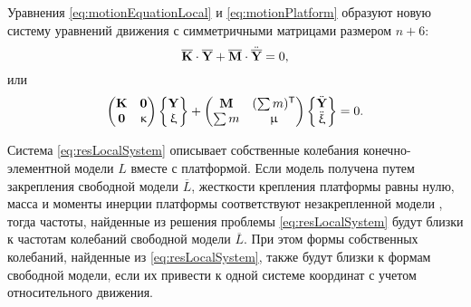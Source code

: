 Уравнения \eqref{eq:motionEquationLocal} и \eqref{eq:motionPlatform} образуют новую систему уравнений движения с симметричными матрицами размером $ n + 6 $:
\begin{equation*}
	\overline{\mathbf{K}} \cdot \overline{\mathbf{Y}} + \overline{\mathbf{M}} \cdot \ddot{\overline{\mathbf{Y}}} = 0,
\end{equation*}
или
\begin{equation}
	\begin{pmatrix}
	\mathbf{K} & \mathbf{0} \\
	\mathbf{0} & \upkappa
	\end{pmatrix}
	\begin{Bmatrix}
	\mathbf{Y} \\
	\upxi
	\end{Bmatrix}
	+
	\begin{pmatrix}
	\mathbf{M} & (\sum m) ^ \mathsf{T} \\
	\sum m & \upmu
	\end{pmatrix}
	\begin{Bmatrix}
	\ddot{\mathbf{Y}} \\
	\ddot{\upxi}
	\end{Bmatrix} = 0.
	\label{eq:resLocalSystem}
\end{equation}

Система \eqref{eq:resLocalSystem} описывает собственные колебания конечно-элементной модели $ L $ вместе с платформой. Если модель  получена путем закрепления свободной модели $ \overline{L} $, жесткости крепления платформы равны нулю, масса и моменты инерции платформы соответствуют незакрепленной модели , тогда частоты, найденные из решения проблемы \eqref{eq:resLocalSystem}  будут близки к частотам  колебаний свободной модели $ \overline{L} $. При этом формы собственных колебаний, найденные из \eqref{eq:resLocalSystem}, также будут близки к формам свободной модели, если их привести к одной системе координат с учетом относительного движения.

